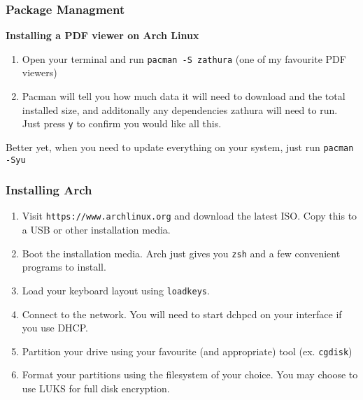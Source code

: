 \documentclass[mathserif]{beamer}
\begin{document}
\begin{frame}
    \frametitle{Package Managment}
    \textbf{Installing a PDF viewer on Arch Linux}
    \begin{enumerate}[<+->]
        \item Open your terminal and run \break
            \texttt{pacman -S zathura} (one of my favourite PDF viewers)
        \item Pacman will tell you how much data it will need to download and
            the total installed size, and additonally any dependencies zathura
            will need to run. Just press \texttt{y} to confirm you would like
            all this.
    \end{enumerate}
    \pause Better yet, when you need to update everything on your system, just run
    \break
    \texttt{pacman -Syu}
\end{frame}

\begin{frame}
    \frametitle{Installing Arch}
    \begin{enumerate}[<+->]
        \item Visit \texttt{https://www.archlinux.org} and download the latest
            ISO. Copy this to a USB or other installation media.
        \item Boot the installation media. Arch just gives you \texttt{zsh} and
            a few convenient programs to install.
        \item Load your keyboard layout using \texttt{loadkeys}.
        \item Connect to the network. You will need to start dchpcd on your
            interface if you use DHCP.
        \item Partition your drive using your favourite (and
            appropriate) tool (ex. \texttt{cgdisk})
        \item Format your partitions using the filesystem of your choice. You
            may choose to use LUKS for full disk encryption.
        \setcounter{enumresume}{\value{enumi}}
    \end{enumerate}
\end{frame}
\end{document}
